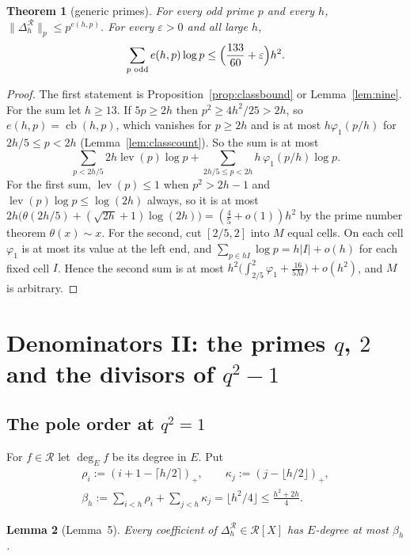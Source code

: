 \documentclass[11pt]{amsart}
\newtheorem{theorem}{Theorem}[section]
\newtheorem{lemma}[theorem]{Lemma}
\theoremstyle{definition}
\theoremstyle{remark}
\numberwithin{equation}{section}
\newcommand{\cR}{\mathcal{R}}
\newcommand{\eps}{\varepsilon}
\newcommand{\lev}{\operatorname{lev}}
\newcommand{\cb}{\operatorname{cb}}
\newcommand{\Ed}{\deg_E}
\begin{document}
\begin{theorem}[generic primes]\label{thm:generic}
For every odd prime $p$ and every $h$, $\|\Delta^{\cR}_h\|_p\le p^{e(h,p)}$. For every $\eps>0$ and all large $h$,
\[
  \sum_{p\text{ odd}}e(h,p)\log p\le\Bigl(\frac{133}{60}+\eps\Bigr)h^2 .
\]
\end{theorem}

\begin{proof}
The first statement is Proposition~\ref{prop:classbound} or Lemma~\ref{lem:nine}. For the sum let $h\ge13$. If
$5p\ge2h$ then $p^2\ge4h^2/25>2h$, so $e(h,p)=\cb(h,p)$, which vanishes for $p\ge2h$ and is at most $h\varphi_1(p/h)$
for $2h/5\le p<2h$ (Lemma~\ref{lem:classcount}). So the sum is at most
\[
  \sum_{p<2h/5}2h\lev(p)\log p+\sum_{2h/5\le p<2h}h\,\varphi_1(p/h)\log p .
\]
For the first sum, $\lev(p)\le1$ when $p^2>2h-1$ and $\lev(p)\log p\le\log(2h)$ always, so it is at most
$2h\bigl(\theta(2h/5)+(\sqrt{2h}+1)\log(2h)\bigr)=(\frac45+o(1))h^2$ by the prime number theorem $\theta(x)\sim x$.
For the second, cut $[2/5,2]$ into $M$ equal cells. On each cell $\varphi_1$ is at most its value at the left end,
and $\sum_{p\in hI}\log p=h|I|+o(h)$ for each fixed cell $I$. Hence the second sum is at most
$h^2\bigl(\int_{2/5}^2\varphi_1+\frac{16}{5M}\bigr)+o(h^2)$, and $M$ is arbitrary.
\end{proof}

\section{\texorpdfstring{Denominators II: the primes $q$, $2$ and the divisors of $q^2-1$}{Denominators II: the primes q, 2 and the divisors of q^2-1}}\label{sec:arith2}

\subsection{The pole order at \texorpdfstring{$q^2=1$}{q^2=1}}
For $f\in\cR$ let $\Ed f$ be its degree in $E$. Put
\begin{gather*}
  \rho_i:=(i+1-\lceil h/2\rceil)_+,\qquad \kappa_j:=(j-\lfloor h/2\rfloor)_+,\\
  \beta_h:=\sum_{i<h}\rho_i+\sum_{j<h}\kappa_j=\lfloor h^2/4\rfloor\le\frac{h^2+2h}4 .
\end{gather*}

\begin{lemma}[Lemma~5]\label{lem:poleorder}
Every coefficient of $\Delta^{\cR}_h\in\cR[X]$ has $E$-degree at most $\beta_h$.
\end{lemma}
\end{document}
